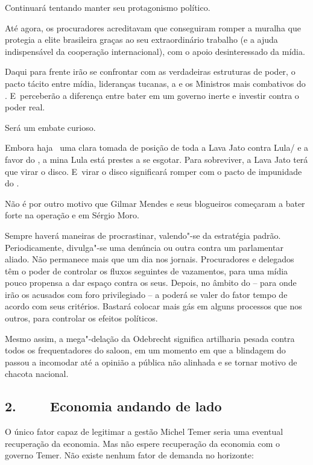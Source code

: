 Continuará tentando manter seu protagonismo político.

Até agora, os procuradores acreditavam que conseguiram romper a muralha
que protegia a elite brasileira graças ao seu extraordinário trabalho (e
a ajuda indispensável da cooperação internacional), com o apoio
desinteressado da mídia.

Daqui para frente irão se confrontar com as verdadeiras estruturas de
poder, o pacto tácito entre mídia, lideranças tucanas, a  e os
Ministros mais combativos do . E~perceberão a diferença entre bater
em um governo inerte e investir contra o poder real.

Será um embate curioso.

Embora haja ~uma clara tomada de posição de toda a Lava Jato contra
Lula/\allowbreak{} e a favor do , a mina Lula está prestes a se esgotar. Para
sobreviver, a Lava Jato terá que virar o disco. E~virar o disco
significará romper com o pacto de impunidade do .

Não é por outro motivo que Gilmar Mendes e seus blogueiros começaram a
bater forte na operação e em Sérgio Moro.

Sempre haverá maneiras de procrastinar, valendo"-se da estratégia padrão.
Periodicamente, divulga"-se uma denúncia ou outra contra um parlamentar
aliado. Não permanece mais que um dia nos jornais. Procuradores e
delegados têm o poder de controlar os fluxos seguintes de vazamentos,
para uma mídia pouco propensa a dar espaço contra os seus. Depois, no
âmbito do  -- para onde irão os acusados com foro privilegiado -- a
 poderá se valer do fator tempo de acordo com seus critérios. Bastará
colocar mais gás em alguns processos que nos outros, para controlar os
efeitos políticos.

Mesmo assim, a mega"-delação da Odebrecht significa artilharia pesada
contra todos os frequentadores do saloon, em um momento em que a
blindagem do  passou a incomodar até a opinião a pública não
alinhada e se tornar motivo de chacota nacional.

\subsection{2.~~~~ Economia andando de lado}

O único fator capaz de legitimar a gestão Michel Temer seria uma
eventual recuperação da economia. Mas não espere recuperação da economia
com o governo Temer. Não existe nenhum fator de demanda no horizonte:

